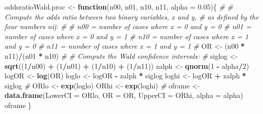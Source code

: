 \documentclass[]{article}
\newenvironment{Shaded}{\begin{snugshade}}{\end{snugshade}}
\newcommand{\CommentTok}[1]{\textcolor[rgb]{0.56,0.35,0.01}{\textit{#1}}}
\newcommand{\ControlFlowTok}[1]{\textcolor[rgb]{0.13,0.29,0.53}{\textbf{#1}}}
\newcommand{\DataTypeTok}[1]{\textcolor[rgb]{0.13,0.29,0.53}{#1}}
\newcommand{\DecValTok}[1]{\textcolor[rgb]{0.00,0.00,0.81}{#1}}
\newcommand{\FloatTok}[1]{\textcolor[rgb]{0.00,0.00,0.81}{#1}}
\newcommand{\KeywordTok}[1]{\textcolor[rgb]{0.13,0.29,0.53}{\textbf{#1}}}
\newcommand{\NormalTok}[1]{#1}
\newcommand{\OperatorTok}[1]{\textcolor[rgb]{0.81,0.36,0.00}{\textbf{#1}}}
\newcommand{\StringTok}[1]{\textcolor[rgb]{0.31,0.60,0.02}{#1}}
\begin{document}
\begin{Shaded}
\begin{Highlighting}[]
\NormalTok{oddsratioWald.proc <-}\StringTok{ }\ControlFlowTok{function}\NormalTok{(n00, n01, n10, n11, }\DataTypeTok{alpha =} \FloatTok{0.05}\NormalTok{)\{}
  \CommentTok{#}
  \CommentTok{#  Compute the odds ratio between two binary variables, x and y,}
  \CommentTok{#  as defined by the four numbers nij:}
  \CommentTok{#}
  \CommentTok{#    n00 = number of cases where x = 0 and y = 0}
  \CommentTok{#    n01 = number of cases where x = 0 and y = 1}
  \CommentTok{#    n10 = number of cases where x = 1 and y = 0}
  \CommentTok{#    n11 = number of cases where x = 1 and y = 1}
  \CommentTok{#}
\NormalTok{  OR <-}\StringTok{ }\NormalTok{(n00 }\OperatorTok{*}\StringTok{ }\NormalTok{n11)}\OperatorTok{/}\NormalTok{(n01 }\OperatorTok{*}\StringTok{ }\NormalTok{n10)}
  \CommentTok{#}
  \CommentTok{#  Compute the Wald confidence intervals:}
  \CommentTok{#}
\NormalTok{  siglog <-}\StringTok{ }\KeywordTok{sqrt}\NormalTok{((}\DecValTok{1}\OperatorTok{/}\NormalTok{n00) }\OperatorTok{+}\StringTok{ }\NormalTok{(}\DecValTok{1}\OperatorTok{/}\NormalTok{n01) }\OperatorTok{+}\StringTok{ }\NormalTok{(}\DecValTok{1}\OperatorTok{/}\NormalTok{n10) }\OperatorTok{+}\StringTok{ }\NormalTok{(}\DecValTok{1}\OperatorTok{/}\NormalTok{n11))}
\NormalTok{  zalph <-}\StringTok{ }\KeywordTok{qnorm}\NormalTok{(}\DecValTok{1} \OperatorTok{-}\StringTok{ }\NormalTok{alpha}\OperatorTok{/}\DecValTok{2}\NormalTok{)}
\NormalTok{  logOR <-}\StringTok{ }\KeywordTok{log}\NormalTok{(OR)}
\NormalTok{  loglo <-}\StringTok{ }\NormalTok{logOR }\OperatorTok{-}\StringTok{ }\NormalTok{zalph }\OperatorTok{*}\StringTok{ }\NormalTok{siglog}
\NormalTok{  loghi <-}\StringTok{ }\NormalTok{logOR }\OperatorTok{+}\StringTok{ }\NormalTok{zalph }\OperatorTok{*}\StringTok{ }\NormalTok{siglog}
  \CommentTok{#}
\NormalTok{  ORlo <-}\StringTok{ }\KeywordTok{exp}\NormalTok{(loglo)}
\NormalTok{  ORhi <-}\StringTok{ }\KeywordTok{exp}\NormalTok{(loghi)}
  \CommentTok{#}
\NormalTok{  oframe <-}\StringTok{ }\KeywordTok{data.frame}\NormalTok{(}\DataTypeTok{LowerCI =}\NormalTok{ ORlo, }\DataTypeTok{OR =}\NormalTok{ OR, }\DataTypeTok{UpperCI =}\NormalTok{ ORhi, }\DataTypeTok{alpha =}\NormalTok{ alpha)}
\NormalTok{  oframe}
\NormalTok{\}}


\end{Highlighting}
\end{Shaded}
\end{document}
